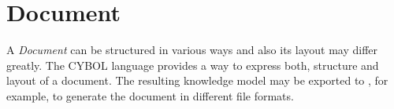 %
%
%
%
%
%

\section{Document}
\label{document_heading}

A \emph{Document} can be structured in various ways and also its layout may
differ greatly. The CYBOL language provides a way to express both, structure
and layout of a document. The resulting knowledge model may be exported to
\latex, for example, to generate the document in different file formats.



